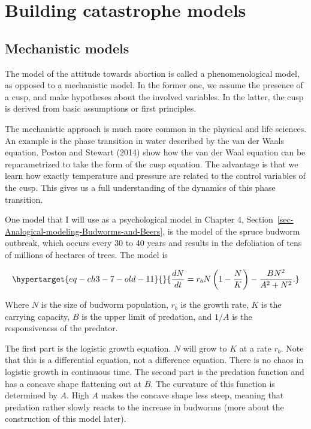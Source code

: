 \documentclass[
  a4paper,
  DIV=11,
  numbers=noendperiod,
  oneside]{scrreprt}
\begin{document}
\hypertarget{sec-Building-catastrophe-models}{%
\section{Building catastrophe
models}\label{sec-Building-catastrophe-models}}

\hypertarget{sec-Mechanistic-models}{%
\subsection{Mechanistic models}\label{sec-Mechanistic-models}}

The model of the attitude towards abortion is called a phenomenological
model, as opposed to a mechanistic model. In the former one, we assume
the presence of a cusp, and make hypotheses about the involved
variables. In the latter, the cusp is derived from basic assumptions or
first principles.

The mechanistic approach is much more common in the physical and life
sciences. An example is the phase transition in water described by the
van der Waals equation. Poston and Stewart (2014) show how the van der
Waal equation can be reparametrized to take the form of the cusp
equation. The advantage is that we learn how exactly temperature and
pressure are related to the control variables of the cusp. This gives us
a full understanding of the dynamics of this phase transition.

One model that I will use as a psychological model in Chapter 4,
Section~\ref{sec-Analogical-modeling-Budworms-and-Beers}, is the model
of the spruce budworm outbreak, which occurs every 30 to 40 years and
results in the defoliation of tens of millions of hectares of trees. The
model is

\begin{equation}\protect\hypertarget{eq-ch3-7-old-11}{}{
\frac{dN}{dt} = r_{b}N\left( 1 - \frac{N}{K} \right) - \frac{BN^{2}}{A^{2} + N^{2}}.
}\label{eq-ch3-7-old-11}\end{equation}

Where \(N\) is the size of budworm population, \(r_{b}\) is the growth
rate, \(K\) is the carrying capacity, \(B\) is the upper limit of
predation, and \(1/A\) is the responsiveness of the predator.

The first part is the logistic growth equation. \(N\) will grow to \(K\)
at a rate \(r_{b}\). Note that this is a differential equation, not a
difference equation. There is no chaos in logistic growth in continuous
time. The second part is the predation function and has a concave shape
flattening out at \(B\). The curvature of this function is determined by
\(A\). High \(A\) makes the concave shape less steep, meaning that
predation rather slowly reacts to the increase in budworms (more about
the construction of this model later).
\end{document}
